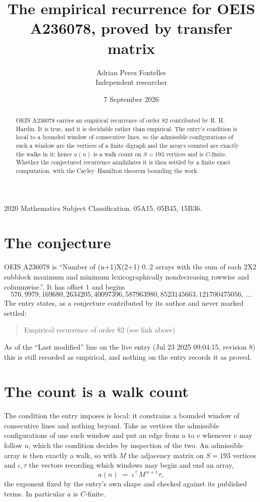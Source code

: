 \documentclass[11pt,a4paper]{article}
\title{The empirical recurrence for OEIS A236078, proved by transfer matrix}
\author{Adrian Perez Fontelles\\ \small Independent researcher}
\date{7 September 2026}
\theoremstyle{plain}
\theoremstyle{definition}
\begin{document}
\maketitle

\begin{abstract}
OEIS A236078 carries an empirical recurrence of order $82$ contributed by R. H. Hardin. It is
true, and it is decidable rather than empirical. The entry's condition is local to a bounded window of consecutive lines, so
the admissible configurations of such a window are the vertices of a finite digraph and the
arrays counted are exactly the walks in it; hence $a(n)$ is a walk count on $S=193$ vertices
and is $C$-finite. Whether the conjectured recurrence annihilates it is then settled by a
finite exact computation, with the Cayley--Hamilton theorem bounding the work.
\end{abstract}

\noindent\small 2020 Mathematics Subject Classification. 05A15, 05B45, 15B36.\normalsize

\section{The conjecture}

OEIS A236078 is ``Number of (n+1)X(2+1) 0..2 arrays with the sum of each 2X2 subblock maximum and minimum lexicographically nondecreasing rowwise and columnwise.''. It has offset $1$ and begins
\[
576, 9979, 169680, 2634205, 40097396, 587963980, 8523145663, 121700475056,\ \dots
\]
The entry states, as a conjecture contributed by its author and never marked settled:
\begin{quote}
Empirical recurrence of order 82 (see link above)
\end{quote}
As of the ``Last modified'' line on the live entry (Jul 23 2025 09:04:15, revision 8) this is still
recorded as empirical, and nothing on the entry records it as proved.

\section{The count is a walk count}

The condition the entry imposes is local: it constrains a bounded window of consecutive lines and nothing beyond. Take as
vertices the admissible configurations of one such window and put an edge from $u$ to $v$
whenever $v$ may follow $u$, which the condition decides by inspection of the two. An
admissible array is then exactly a walk, so with $M$ the adjacency matrix on $S=193$ vertices
and $\iota,\tau$ the vectors recording which windows may begin and end an array,
\[
a(n)\;=\;\iota^{\!\top}M^{\,n+1}\tau ,
\]
the exponent fixed by the entry's own shape and checked against its published terms. In
particular $a$ is $C$-finite.
\end{document}
